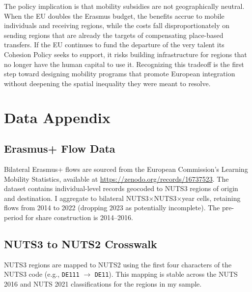 \documentclass[12pt]{article}
\begin{document}
The policy implication is that mobility subsidies are not geographically neutral. When the EU doubles the Erasmus budget, the benefits accrue to mobile individuals and receiving regions, while the costs fall disproportionately on sending regions that are already the targets of compensating place-based transfers. If the EU continues to fund the departure of the very talent its Cohesion Policy seeks to support, it risks building infrastructure for regions that no longer have the human capital to use it. Recognizing this tradeoff is the first step toward designing mobility programs that promote European integration without deepening the spatial inequality they were meant to resolve.

\label{apep_main_text_end}

\clearpage


\clearpage
\appendix

\section{Data Appendix}
\label{app:data}

\subsection{Erasmus+ Flow Data}

Bilateral Erasmus+ flows are sourced from the European Commission's Learning Mobility Statistics, available at \url{https://zenodo.org/records/16737523}. The dataset contains individual-level records geocoded to NUTS3 regions of origin and destination. I aggregate to bilateral NUTS3$\times$NUTS3$\times$year cells, retaining flows from 2014 to 2022 (dropping 2023 as potentially incomplete). The pre-period for share construction is 2014--2016.

\subsection{NUTS3 to NUTS2 Crosswalk}

NUTS3 regions are mapped to NUTS2 using the first four characters of the NUTS3 code (e.g., \texttt{DE111} $\to$ \texttt{DE11}). This mapping is stable across the NUTS 2016 and NUTS 2021 classifications for the regions in my sample.
\end{document}
